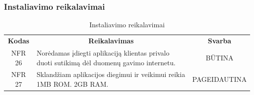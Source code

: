\documentclass{VUMIFPSkursinis}
\begin{document}
\subsubsection{Instaliavimo reikalavimai }
\begin{center}
	\begin{table}[H]
	\caption{Instaliavimo reikalavimai}
	\begin{tabular}{|p{2cm}|p{}|p{}|}
	\hline
	    \rowcolor{lightgray}
		\multicolumn{3}{|c|}{Instaliavimo reikalavimai}\\
		
	\hline
		\multicolumn{1}{|c|}{{\bfseries Kodas}}&
		\multicolumn{1}{|c|}{{\bfseries Reikalavimas}}&
		\multicolumn{1}{|c|}{{\bfseries Svarba}}\\
	\hline 	
		\multicolumn{1}{|c|}{NFR 26}&
		{Norėdamas įdiegti aplikaciją klientas privalo duoti sutikimą dėl duomenų gavimo internetu.}&
		\multicolumn{1}{|c|}{BŪTINA}\\	
	
	\hline 	
		\multicolumn{1}{|c|}{NFR 27}&
		{Sklandžiam aplikacijos diegimui ir veikimui reikia 1MB ROM. 2GB RAM.}&
		\multicolumn{1}{|p{1.5cm}|}{PAGEIDAUTINA}\\	
	
	\hline
	
	
	\end{tabular}
	
	\label{table:Instaliavimoreikalavimai}
	\end{table}

\end{center}
\end{document}
